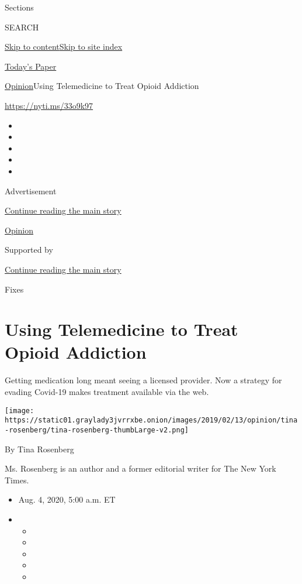 Sections

SEARCH

\protect\hyperlink{site-content}{Skip to
content}\protect\hyperlink{site-index}{Skip to site index}

\href{https://myaccount.nytimes3xbfgragh.onion/auth/login?response_type=cookie\&client_id=vi}{}

\href{https://www.nytimes3xbfgragh.onion/section/todayspaper}{Today's
Paper}

\href{/section/opinion}{Opinion}\textbar{}Using Telemedicine to Treat
Opioid Addiction

\url{https://nyti.ms/33o9k97}

\begin{itemize}
\item
\item
\item
\item
\item
\end{itemize}

Advertisement

\protect\hyperlink{after-top}{Continue reading the main story}

\href{/section/opinion}{Opinion}

Supported by

\protect\hyperlink{after-sponsor}{Continue reading the main story}

Fixes

\hypertarget{using-telemedicine-to-treat-opioid-addiction}{%
\section{Using Telemedicine to Treat Opioid
Addiction}\label{using-telemedicine-to-treat-opioid-addiction}}

Getting medication long meant seeing a licensed provider. Now a strategy
for evading Covid-19 makes treatment available via the web.

\texttt{[image: https://static01.graylady3jvrrxbe.onion/images/2019/02/13/opinion/tina-rosenberg/tina-rosenberg-thumbLarge-v2.png]}

By Tina Rosenberg

Ms. Rosenberg is an author and a former editorial writer for The New
York Times.

\begin{itemize}
\item
  Aug. 4, 2020, 5:00 a.m. ET
\item
  \begin{itemize}
  \item
  \item
  \item
  \item
  \item
  \end{itemize}
\end{itemize}

